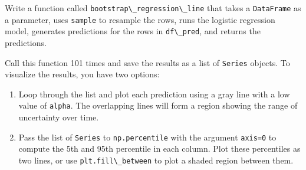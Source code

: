 Write a function called
\passthrough{\lstinline!bootstrap\_regression\_line!} that takes a
\passthrough{\lstinline!DataFrame!} as a parameter, uses
\passthrough{\lstinline!sample!} to resample the rows, runs the logistic
regression model, generates predictions for the rows in
\passthrough{\lstinline!df\_pred!}, and returns the predictions.

Call this function 101 times and save the results as a list of
\passthrough{\lstinline!Series!} objects. To visualize the results, you
have two options:

\begin{enumerate}
\def\labelenumi{\arabic{enumi}.}
\item
  Loop through the list and plot each prediction using a gray line with
  a low value of \passthrough{\lstinline!alpha!}. The overlapping lines
  will form a region showing the range of uncertainty over time.
\item
  Pass the list of \passthrough{\lstinline!Series!} to
  \passthrough{\lstinline!np.percentile!} with the argument
  \passthrough{\lstinline!axis=0!} to compute the 5th and 95th
  percentile in each column. Plot these percentiles as two lines, or use
  \passthrough{\lstinline!plt.fill\_between!} to plot a shaded region
  between them.
\end{enumerate}

